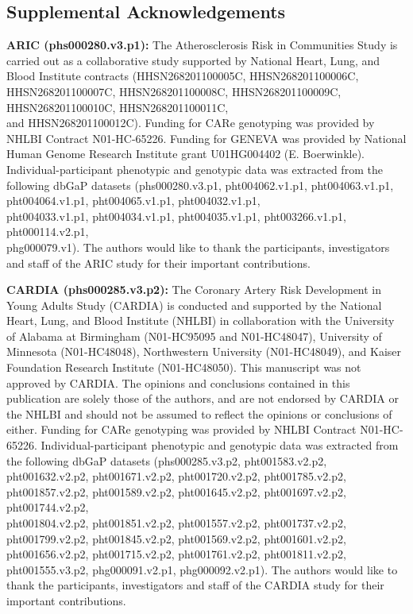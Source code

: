 \documentclass[12pt]{article}
\begin{document}
\subsection{Supplemental Acknowledgements}
\textbf{ARIC (phs000280.v3.p1):} The Atherosclerosis Risk in Communities Study is carried out as a collaborative study supported by National Heart, Lung, and Blood Institute contracts (HHSN268201100005C, HHSN268201100006C, HHSN268201100007C, HHSN268201100008C, HHSN268201100009C, HHSN268201100010C, HHSN268201100011C, \\and HHSN268201100012C). Funding for CARe genotyping was provided by NHLBI Contract N01-HC-65226. Funding for GENEVA was provided by National Human Genome Research Institute grant U01HG004402 (E. Boerwinkle). Individual-participant phenotypic and genotypic data was extracted from the following dbGaP datasets (phs000280.v3.p1, pht004062.v1.p1, pht004063.v1.p1, pht004064.v1.p1, pht004065.v1.p1, pht004032.v1.p1, \\pht004033.v1.p1, pht004034.v1.p1, pht004035.v1.p1, pht003266.v1.p1, pht000114.v2.p1, \\phg000079.v1). The authors would like to thank the participants, investigators and staff of the ARIC study for their important contributions.

\textbf{CARDIA (phs000285.v3.p2):} The Coronary Artery Risk Development in Young Adults Study (CARDIA) is conducted and supported by the National Heart, Lung, and Blood Institute (NHLBI) in collaboration with the University of Alabama at Birmingham (N01-HC95095 and N01-HC48047), University of Minnesota (N01-HC48048), Northwestern University (N01-HC48049), and Kaiser Foundation Research Institute (N01-HC48050). This manuscript was not approved by CARDIA. The opinions and conclusions contained in this publication are solely those of the authors, and are not endorsed by CARDIA or the NHLBI and should not be assumed to reflect the opinions or conclusions of either. Funding for CARe genotyping was provided by NHLBI Contract N01-HC-65226. Individual-participant phenotypic and genotypic data was extracted from the following dbGaP datasets (phs000285.v3.p2, pht001583.v2.p2, pht001632.v2.p2, pht001671.v2.p2, pht001720.v2.p2, pht001785.v2.p2, \\pht001857.v2.p2, pht001589.v2.p2, pht001645.v2.p2, pht001697.v2.p2, pht001744.v2.p2, \\pht001804.v2.p2, pht001851.v2.p2, pht001557.v2.p2, pht001737.v2.p2, pht001799.v2.p2, pht001845.v2.p2, pht001569.v2.p2, pht001601.v2.p2, pht001656.v2.p2, pht001715.v2.p2, pht001761.v2.p2, pht001811.v2.p2, pht001555.v3.p2, phg000091.v2.p1, phg000092.v2.p1). The authors would like to thank the participants, investigators and staff of the CARDIA study for their important contributions.
\end{document}
